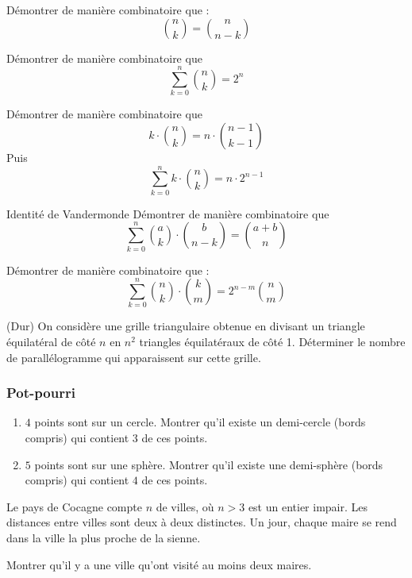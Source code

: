 \begin{exo}
Démontrer de manière combinatoire que :
$$\binom{n}{k}=\binom{n}{n-k}$$
\end{exo}


\begin{exo}
Démontrer de manière combinatoire que
$$ \sum_{k = 0}^{n}{\binom{n}{k}} = 2^n $$
\end{exo}


\begin{exo}
Démontrer de manière combinatoire que
$$k \cdot \binom{n}{k} = n \cdot \binom{n-1}{k-1}$$
Puis
$$\sum_{k = 0}^{n}{k \cdot \binom{n}{k}} = n \cdot 2^{n-1}$$
\end{exo}


\begin{exo}{Identité de Vandermonde}
Démontrer de manière combinatoire que
$$\sum_{k = 0}^{n}{\binom{a}{k} \cdot \binom{b}{n-k}} = \binom{a+b}{n}$$
\end{exo}


\begin{exo}
Démontrer de manière combinatoire que :
$$\sum_{k = 0}^{n}{\binom{n}{k} \cdot \binom{k}{m}} = 2^{n-m}{\binom{n}{m}}$$
\end{exo}


\begin{exo}
(Dur) On considère une grille triangulaire obtenue en divisant un triangle équilatéral de côté $n$ en $n^2$ triangles équilatéraux de côté 1. Déterminer le nombre de parallélogramme qui apparaissent sur cette grille.
\end{exo}


\subsubsection{Pot-pourri}

\begin{exo}
\begin{enumerate}
\item $4$ points sont sur un cercle. Montrer qu’il existe un demi-cercle (bords compris) qui contient $3$ de ces points.
\item $5$ points sont sur une sphère. Montrer qu’il existe une demi-sphère (bords compris) qui contient $4$ de ces points.
\end{enumerate}
\end{exo}

\begin{exo}
Le pays de Cocagne compte $n$ de villes, où $n > 3$ est un entier impair. Les distances entre villes sont deux à deux distinctes. Un jour, chaque maire se rend dans la ville la plus proche de la sienne.

Montrer qu’il y a une ville qu’ont visité au moins deux maires.
\end{exo}

